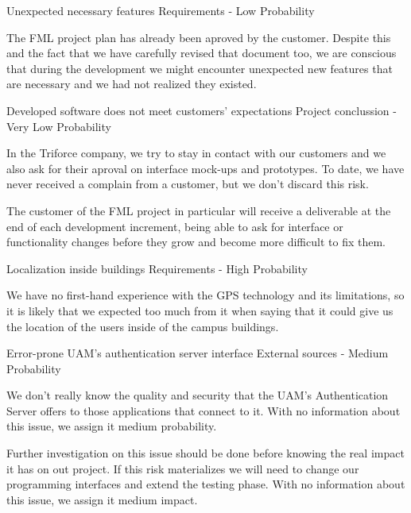 \begin{risk}{Unexpected necessary features}
\riskcat Requirements
 - Low Probability 

The FML project plan has already been aproved by the customer. Despite this and the fact that we have carefully revised that document too, we are conscious that during the development we might encounter unexpected new features that are necessary and we had not realized they existed.
\end{risk}

\begin{risk}{Developed software does not meet customers' expectations}
\riskcat Project conclussion
 - Very Low Probability 

In the Triforce company, we try to stay in contact with our customers and we also ask for their aproval on interface mock-ups and prototypes. To date, we have never received a complain from a customer, but we don't discard this risk.

The customer of the FML project in particular will receive a deliverable at the end of each development increment, being able to ask for interface or functionality changes before they grow and become more difficult to fix them.
\end{risk}

\begin{risk}{Localization inside buildings}
\riskcat Requirements
 - High Probability 

We have no first-hand experience with the GPS technology and its limitations, so it is likely that we expected too much from it when saying that it could give us the location of the users inside of the campus buildings.
\end{risk}

\begin{risk}{Error-prone UAM's authentication server interface}
\riskcat External sources
 - Medium Probability 

We don't really know the quality and security that the UAM's Authentication Server offers to those applications that connect to it. With no information about this issue, we assign it medium probability.

Further investigation on this issue should be done before knowing the real impact it has on out project. If this risk materializes we will need to change our programming interfaces and extend the testing phase. With no information about this issue, we assign it medium impact.
\end{risk}

